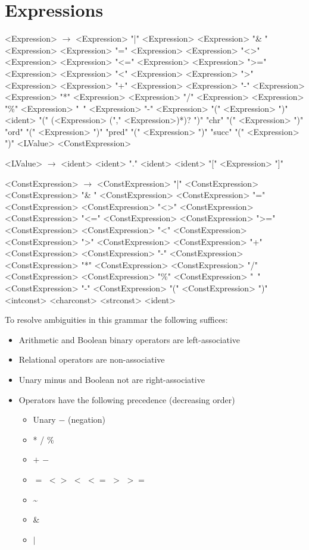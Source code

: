 \documentclass{book}
\begin{document}
\section{Expressions}
\begin{grammar}
<Expression> $\rightarrow$ <Expression> "|" <Expression>
\alt <Expression> "\& " <Expression>
\alt <Expression> "=" <Expression>
\alt <Expression> "<>" <Expression>
\alt <Expression> "<=" <Expression>
\alt <Expression> ">=" <Expression>
\alt <Expression> "<" <Expression>
\alt <Expression> ">" <Expression>
\alt <Expression> "+" <Expression>
\alt <Expression> "-" <Expression>
\alt <Expression> "*" <Expression>
\alt <Expression> "/" <Expression>
\alt <Expression> "\%" <Expression>
\alt "~" <Expression>
\alt "-" <Expression>
\alt "(" <Expression> ")"
\alt <ident> "(" (<Expression> ("," <Expression>)*)? ")"
\alt "chr" "(" <Expression> ")"
\alt "ord" "(" <Expression> ")"
\alt "pred" "(" <Expression> ")"
\alt "succ" "(" <Expression> ")"
\alt <LValue>
\alt <ConstExpression>

<LValue> $\rightarrow$ <ident>
\alt <ident> "." <ident>
\alt <ident> "[" <Expression> "]"

<ConstExpression> $\rightarrow$ <ConstExpression> "|" <ConstExpression>
\alt <ConstExpression> "\& " <ConstExpression>
\alt <ConstExpression> "=" <ConstExpression>
\alt <ConstExpression> "<>" <ConstExpression>
\alt <ConstExpression> "<=" <ConstExpression>
\alt <ConstExpression> ">=" <ConstExpression>
\alt <ConstExpression> "<" <ConstExpression>
\alt <ConstExpression> ">" <ConstExpression>
\alt <ConstExpression> "+" <ConstExpression>
\alt <ConstExpression> "-" <ConstExpression>
\alt <ConstExpression> "*" <ConstExpression>
\alt <ConstExpression> "/" <ConstExpression>
\alt <ConstExpression> "\%" <ConstExpression>
\alt "~" <ConstExpression>
\alt "-" <ConstExpression>
\alt "(" <ConstExpression> ")"
\alt <intconst>
\alt <charconst>
\alt <strconst>
\alt <ident>

\end{grammar}
To resolve ambiguities in this grammar the following suffices:
\begin{itemize}
\item Arithmetic and Boolean binary operators are left-associative
\item Relational operators are non-associative
\item Unary minus and Boolean not are right-associative
\item Operators have the following precedence (decreasing order)
\begin{itemize}
\item Unary $-$ (negation)
\item * / \%
\item $+$ $-$
\item $=$ $<>$ $<$ $<=$ $>$ $>=$
\item \textasciitilde
\item \&
\item $|$
\end{itemize}
\end{itemize}
\end{document}

